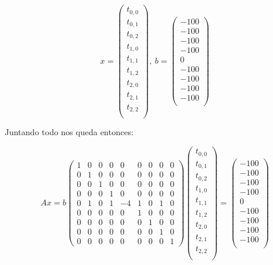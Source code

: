\[ x =  \left( \begin{array}{c}
t_{0,0} \\
t_{0,1} \\
t_{0,2} \\
t_{1,0} \\
t_{1,1} \\
t_{1,2} \\
t_{2,0} \\
t_{2,1} \\
t_{2,2} \\
\end{array} \right), \  b = \left( \begin{array}{c}
-100 \\
-100 \\
-100 \\
-100 \\
0 \\
-100 \\
-100 \\
-100 \\
-100 \\
\end{array} \right)
\] 

Juntando todo nos queda entonces:

\[ Ax = b


\left( \begin{array}{ccccccccc}
1 & 0 & 0 & 0 & 0 & 0 & 0 & 0 & 0 \\
0 & 1 & 0 & 0 & 0 & 0 & 0 & 0 & 0 \\
0 & 0 & 1 & 0 & 0 & 0 & 0 & 0 & 0 \\ 
0 & 0 & 0 & 1 & 0 & 0 & 0 & 0 & 0 \\
0 & 1 & 0 & 1 & -4 & 1 & 0 & 1 & 0 \\
0 & 0 & 0 & 0 & 0 & 1 & 0 & 0 & 0 \\ 
0 & 0 & 0 & 0 & 0 & 0 & 1 & 0 & 0 \\
0 & 0 & 0 & 0 & 0 & 0 & 0 & 1 & 0 \\
0 & 0 & 0 & 0 & 0 & 0 & 0 & 0 & 1
\end{array} \right)	\left( \begin{array}{c}
t_{0,0} \\
t_{0,1} \\
t_{0,2} \\
t_{1,0} \\
t_{1,1} \\
t_{1,2} \\
t_{2,0} \\
t_{2,1} \\
t_{2,2} \\
\end{array} \right) = \left( \begin{array}{c}
-100 \\
-100 \\
-100 \\
-100 \\
0 \\
-100 \\
-100 \\
-100 \\
-100 \\
\end{array} \right)
\] 

